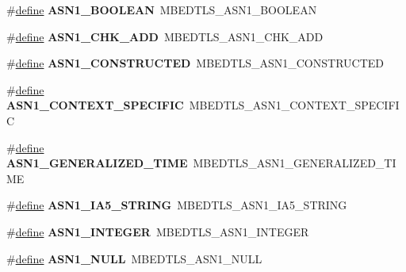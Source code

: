 \begin{DoxyCompactItemize}
\#\hyperlink{structdefine}{define} {\bfseries A\+S\+N1\+\_\+\+B\+O\+O\+L\+E\+AN}~M\+B\+E\+D\+T\+L\+S\+\_\+\+A\+S\+N1\+\_\+\+B\+O\+O\+L\+E\+AN
\item 
\mbox{\label{compat-1_83_8h_a59a0e7232df596386a3662126e055f28}} 
\#\hyperlink{structdefine}{define} {\bfseries A\+S\+N1\+\_\+\+C\+H\+K\+\_\+\+A\+DD}~M\+B\+E\+D\+T\+L\+S\+\_\+\+A\+S\+N1\+\_\+\+C\+H\+K\+\_\+\+A\+DD
\item 
\mbox{\label{compat-1_83_8h_a799d7b17a9532e1dadc8355f04477e27}} 
\#\hyperlink{structdefine}{define} {\bfseries A\+S\+N1\+\_\+\+C\+O\+N\+S\+T\+R\+U\+C\+T\+ED}~M\+B\+E\+D\+T\+L\+S\+\_\+\+A\+S\+N1\+\_\+\+C\+O\+N\+S\+T\+R\+U\+C\+T\+ED
\item 
\mbox{\label{compat-1_83_8h_ab1f89bc6e469d46d5293f724d317d1d7}} 
\#\hyperlink{structdefine}{define} {\bfseries A\+S\+N1\+\_\+\+C\+O\+N\+T\+E\+X\+T\+\_\+\+S\+P\+E\+C\+I\+F\+IC}~M\+B\+E\+D\+T\+L\+S\+\_\+\+A\+S\+N1\+\_\+\+C\+O\+N\+T\+E\+X\+T\+\_\+\+S\+P\+E\+C\+I\+F\+IC
\item 
\mbox{\label{compat-1_83_8h_ab7a08388517b5d807fb6bc2ed0325b90}} 
\#\hyperlink{structdefine}{define} {\bfseries A\+S\+N1\+\_\+\+G\+E\+N\+E\+R\+A\+L\+I\+Z\+E\+D\+\_\+\+T\+I\+ME}~M\+B\+E\+D\+T\+L\+S\+\_\+\+A\+S\+N1\+\_\+\+G\+E\+N\+E\+R\+A\+L\+I\+Z\+E\+D\+\_\+\+T\+I\+ME
\item 
\mbox{\label{compat-1_83_8h_a45d8160d9158c5e040db66bb79fc8f18}} 
\#\hyperlink{structdefine}{define} {\bfseries A\+S\+N1\+\_\+\+I\+A5\+\_\+\+S\+T\+R\+I\+NG}~M\+B\+E\+D\+T\+L\+S\+\_\+\+A\+S\+N1\+\_\+\+I\+A5\+\_\+\+S\+T\+R\+I\+NG
\item 
\mbox{\label{compat-1_83_8h_a0d3b979ef2ca9618ec1899fd0e14d8ec}} 
\#\hyperlink{structdefine}{define} {\bfseries A\+S\+N1\+\_\+\+I\+N\+T\+E\+G\+ER}~M\+B\+E\+D\+T\+L\+S\+\_\+\+A\+S\+N1\+\_\+\+I\+N\+T\+E\+G\+ER
\item 
\mbox{\label{compat-1_83_8h_a381db5db1873cb0b03744322cd9bc19c}} 
\#\hyperlink{structdefine}{define} {\bfseries A\+S\+N1\+\_\+\+N\+U\+LL}~M\+B\+E\+D\+T\+L\+S\+\_\+\+A\+S\+N1\+\_\+\+N\+U\+LL
\item 
\mbox{\label{compat-1_83_8h_ae251e2c2d40228a89468f3f939a18585}} 

\end{DoxyCompactItemize}

